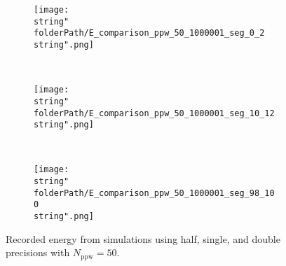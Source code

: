 \begin{minipage}[t]{.5\textwidth}
%
\begin{figure}[H]
\captionsetup{width=0.95\textwidth,font=footnotesize,labelfont=footnotesize}
\centering
%
\begin{subfigure}[b]{1\textwidth}
%
\centering\texttt{[image: \\string"\\folderPath/E\_comparison\_ppw\_50\_1000001\_seg\_0\_2\\string".png]}
%
\end{subfigure}\hfill
\\[2ex]
%
\begin{subfigure}[b]{1\textwidth}
%
\centering\texttt{[image: \\string"\\folderPath/E\_comparison\_ppw\_50\_1000001\_seg\_10\_12\\string".png]}
%
\end{subfigure}\hfill
\\[2ex]
%
\begin{subfigure}[b]{1\textwidth}
%
\centering\texttt{[image: \\string"\\folderPath/E\_comparison\_ppw\_50\_1000001\_seg\_98\_100\\string".png]}
%
\end{subfigure}\hfill
%
\caption{Recorded energy from simulations using half, single, and double precisions with $N_\text{ppw}=50$.}
\label{comparison_E_half_compensated_segments_ppw_50_slow2sum}
\end{figure}
%
\end{minipage}


\renewcommand{\folderPath}{\string"/dev/null\string"}